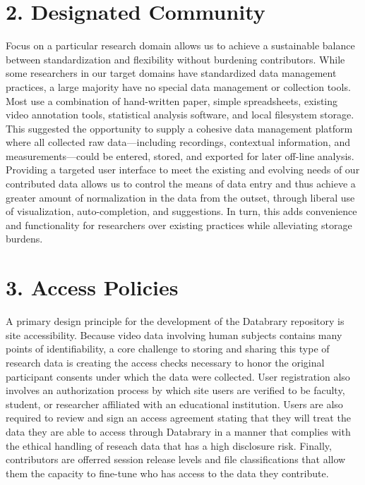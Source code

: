 \documentclass{sig-alternate}
\begin{document}
\section{2. Designated Community}

Focus on a particular research domain allows us to achieve a sustainable balance between standardization and flexibility without burdening contributors.
While some researchers in our target domains have standardized data management practices, a large majority have no special data management or collection tools.
Most use a combination of hand-written paper, simple spreadsheets, existing video annotation tools, statistical analysis software, and local filesystem storage.
This suggested the opportunity to supply a cohesive data management platform where all collected raw data---including recordings, contextual information, and measurements---could be entered, stored, and exported for later off-line analysis.
Providing a targeted user interface to meet the existing and evolving needs of our contributed data allows us to control the means of data entry and thus achieve a greater amount of normalization in the data from the outset, through liberal use of visualization, auto-completion, and suggestions.
In turn, this adds convenience and functionality for researchers over existing practices while alleviating storage burdens.

\section{3. Access Policies}

A primary design principle for the development of the Databrary repository is site accessibility. 
Because video data involving human subjects contains many points of identifiability, a core challenge to storing and sharing this type of research data is creating the access checks necessary to honor the original participant consents under which the data were collected. User registration also involves an authorization process by which site users are verified to be faculty, student, or researcher affiliated with an educational institution.
Users are also required to review and sign an access agreement stating that they will treat the data they are able to access through Databrary in a manner that complies with the ethical handling of reseach data that has a high disclosure risk.
Finally, contributors are offerred session release levels and file classifications that allow them the capacity to fine-tune who has access to the data they contribute. 
\end{document}
